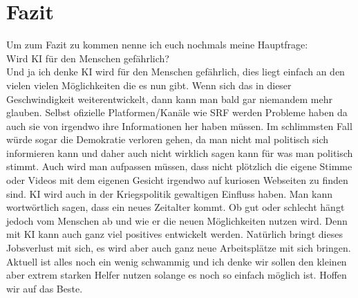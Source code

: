 \chapter{Fazit}
Um zum Fazit zu kommen nenne ich euch nochmals meine Hauptfrage:
\\
Wird KI für den Menschen gefährlich?
\\
Und ja ich denke KI wird für den Menschen gefährlich, dies liegt einfach an den vielen vielen Möglichkeiten die es nun gibt.
Wenn sich das in dieser Geschwindigkeit weiterentwickelt, dann kann man bald gar niemandem mehr glauben. Selbst ofizielle Platformen/Kanäle wie SRF werden Probleme haben da auch sie von irgendwo ihre Informationen her haben müssen.
Im schlimmsten Fall würde sogar die Demokratie verloren gehen, da man nicht mal politisch sich informieren kann und daher auch nicht wirklich sagen kann für was man politisch stimmt.
Auch wird man aufpassen müssen, dass nicht plötzlich die eigene Stimme oder Videos mit dem eigenen Gesicht irgendwo auf kuriosen Webseiten zu finden sind. KI wird auch in der Kriegspolitik gewaltigen Einfluss haben.
Man kann wortwörtlich sagen, dass ein neues Zeitalter kommt. Ob gut oder schlecht hängt jedoch vom Menschen ab und wie er die neuen Möglichkeiten nutzen wird. Denn mit KI kann auch ganz viel positives entwickelt werden. Natürlich bringt dieses Jobsverlust mit sich, es wird aber auch ganz neue Arbeitsplätze mit sich bringen.
Aktuell ist alles noch ein wenig schwammig und ich denke wir sollen den kleinen aber extrem starken Helfer nutzen solange es noch so einfach möglich ist.
Hoffen wir auf das Beste.